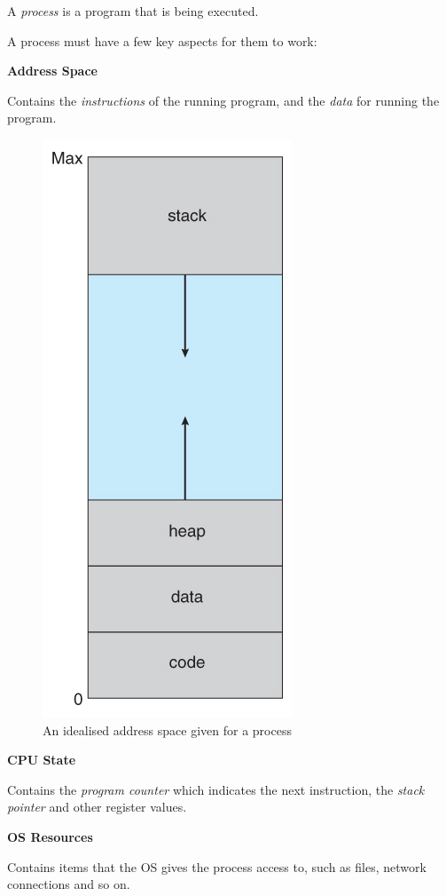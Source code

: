 \documentclass{article}
\begin{document}
A \textit{process} is a program that is being executed.

A process must have a few key aspects for them to work:

\textbf{Address Space}

Contains the \textit{instructions} of the running program, and the \textit{data} for running the program.

\begin{figure}[H]
  \centering
  \includegraphics[scale=0.64]{addressspace}
  \caption{An idealised address space given for a process}
\end{figure}

\textbf{CPU State}

Contains the \textit{program counter} which indicates the next instruction, the \textit{stack pointer} and other register values.

\textbf{OS Resources}

Contains items that the OS gives the process access to, such as files, network connections and so on.
\end{document}
